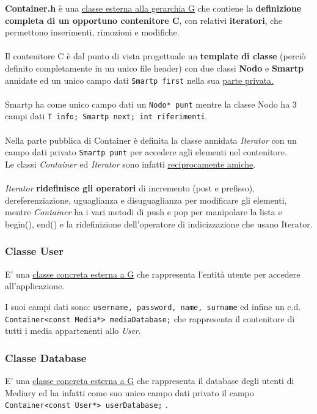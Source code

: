 \documentclass[10pt,a4paper,openany]{article}
\begin{document}
		\textbf{Container.h} è una \underline{classe esterna alla gerarchia G} che contiene la \textbf{definizione completa di un opportuno contenitore C}, con relativi 
		\textbf{iteratori}, che permettono inserimenti, rimozioni e modifiche.\\\\
		Il contenitore C è dal punto di vista progettuale un \textbf{template di classe} (perciò definito completamente in un unico file header) con due classi 
		\textbf{Nodo} e \textbf{Smartp} annidate ed un unico campo dati \texttt{Smartp first} nella sua \underline{parte privata.}\\\\
		Smartp ha come unico campo dati un \texttt{Nodo* punt} mentre la classe Nodo ha 3 campi dati \texttt{T info; Smartp next; int riferimenti}.\\\\
		Nella parte pubblica di Container è definita la classe annidata \emph{Iterator} con un campo dati privato \texttt{Smartp punt} per accedere agli elementi nel 
		contenitore.\\
		Le classi \emph{Container} ed \emph{Iterator} sono infatti \underline{reciprocamente amiche}.\\\\
		\emph{Iterator} \textbf{ridefinisce gli operatori} di incremento (post e prefisso), dereferenziazione, uguaglianza e disuguaglianza per modificare gli elementi, 
		mentre \emph{Container} ha i vari metodi di push e pop per manipolare la lista e begin(), end() e la ridefinizione dell'operatore di indicizzazione che usano 
		Iterator.
		
		\subsubsection{Classe User}
		
		E' una \underline{classe concreta esterna a G} che rappresenta l'entità utente per accedere all'applicazione.
		
		I suoi campi dati sono: \texttt{username, password, name, surname} ed infine un c.d. \texttt{Container<const Media*> mediaDatabase;} che rappresenta il 
		contenitore di tutti i media appartenenti allo \emph{User}.
		
		\subsubsection{Classe Database}
		
		E' una \underline{classe concreta esterna a G} che rappresenta il database degli utenti di Mediary ed ha infatti come suo unico campo dati privato il campo
		\texttt{Container<const User*> userDatabase;} .
	
\end{document}
